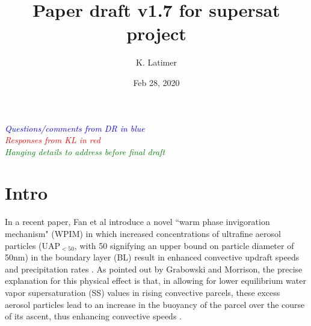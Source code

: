 \documentclass{article}
\title{Paper draft v1.7 for supersat project}
\author{K. Latimer}
\date{Feb 28, 2020}
\newcommand{\drcomm}[1]{\textcolor{blue}{\textit{#1}}}
\newcommand{\klcomm}[1]{\textcolor{red}{\textit{#1}}}
\newcommand{\todo}[1]{\textcolor{green}{\textit{#1}}}
\begin{document}
\maketitle

\noindent\drcomm{Questions/comments from DR in blue} \\
\noindent\klcomm{Responses from KL in red}\\
\noindent\todo{Hanging details to address before final draft}\\

\section{Intro}

In a recent paper, Fan et al introduce a novel ``warm phase invigoration mechanism" (WPIM) in which increased concentrations of ultrafine aerosol particles (UAP$_{<50}$, with 50 signifying an upper bound on particle diameter of 50nm) in the boundary layer (BL) result in enhanced convective updraft speeds and precipitation rates \cite{Fan2018}. As pointed out by Grabowski and Morrison, the precise explanation for this physical effect is that, in allowing for lower equilibrium water vapor supersaturation (SS) values in rising convective parcels, these excess aerosol particles lead to an increase in the buoyancy of the parcel over the course of its ascent, thus enhancing convective speeds \cite{Grabowski2020}.
\end{document}
